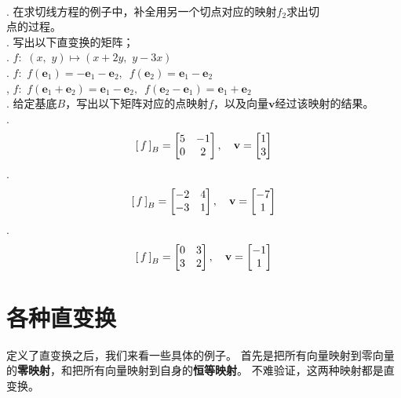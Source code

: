 \documentclass[12pt,UTF8,fontset=none]{ctexbook}
\begin{document}
\begin{xt}
    \mbox{} \\
    . 在求切线方程的例子中，补全用另一个切点对应的映射$f_2$求出切 \\
    \indent 点的过程。\\
    . 写出以下直变换的矩阵；\\
    . $f: \,\, (x,\,\, y) \mapsto (x + 2y,\,\, y - 3x)$ \\
    . $f: \,\, f(\mathbf{e}_1) = -\mathbf{e}_1 - \mathbf{e}_2,\,\,\, f(\mathbf{e}_2) = \mathbf{e}_1 - \mathbf{e}_2$ \\
    , $f: \,\, f(\mathbf{e}_1 + \mathbf{e}_2) = \mathbf{e}_1 - \mathbf{e}_2,\,\,\, f(\mathbf{e}_2 - \mathbf{e}_1) = \mathbf{e}_1 + \mathbf{e}_2$ \\
    . 给定基底$B$，写出以下矩阵对应的点映射$f$，以及向量$\mathbf{v}$经过该映射的结果。\\
    . $$
                \bmat{f}[B] = 
                \begin{bmatrix}
                    5 & -1 \\ 0 & 2
                \end{bmatrix},\quad \mathbf{v} = \begin{bmatrix}
                    1\\ 3
                \end{bmatrix}
                $$
    . $$
                \bmat{f}[B] = 
                \begin{bmatrix}
                    -2 & 4 \\ -3 & 1
                \end{bmatrix},\quad \mathbf{v} = \begin{bmatrix}
                    -7\\ 1
                \end{bmatrix}
                $$
    . $$
                \bmat{f}[B] = 
                \begin{bmatrix}
                    0 & 3 \\ 3 & 2
                \end{bmatrix},\quad \mathbf{v} = \begin{bmatrix}
                    -1\\ 1
                \end{bmatrix}
                $$
\end{xt}

\section{各种直变换}
定义了直变换之后，我们来看一些具体的例子。
首先是把所有向量映射到零向量的\textbf{零映射}，和把所有向量映射到自身的\textbf{恒等映射}。
不难验证，这两种映射都是直变换。
\end{document}
